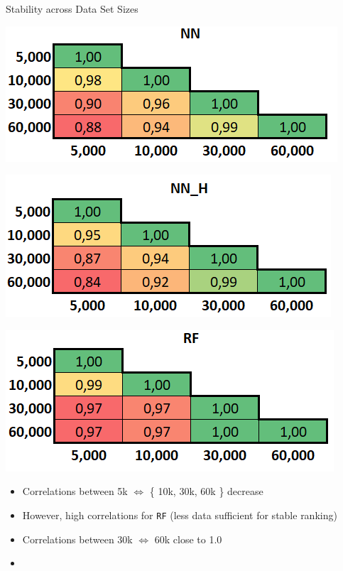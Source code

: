 \documentclass[accentcolor=tud1a,colorbacktitle,inverttitle,landscape,german,presentation,t]{tudbeamer}
\begin{document}
\begin{frame}{Stability across Data Set Sizes}{}
	\begin{minipage}{0.32\textwidth}
		\centering
		\includegraphics[scale=0.3]{images/corr_wc_en_nn}
	\end{minipage}
	\hfill
	\begin{minipage}{0.32\textwidth}
		\centering
		\includegraphics[scale=0.3]{images/corr_wc_en_nn_h}
	\end{minipage}
	\hfill
	\begin{minipage}{0.32\textwidth}
		\centering
		\includegraphics[scale=0.3]{images/corr_wc_en_rf}
	\end{minipage}

	\vspace*{5mm}

	\begin{itemize}\setlength\itemsep{1em}
		\item Correlations between 5k $\Leftrightarrow$ \{ 10k, 30k, 60k \} decrease
		\item However, high correlations for \texttt{RF} (less data sufficient for stable ranking)
		\item Correlations between 30k $\Leftrightarrow$ 60k close to 1.0
		\item {}
	\end{itemize}
\end{frame}
\end{document}
